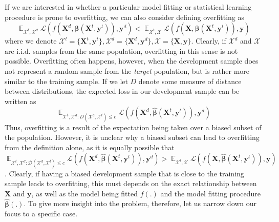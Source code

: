 \documentclass[12pt]{article}
\DeclareMathOperator{\E}{\mathbb{E}}
\begin{document}
	If we are interested in whether a particular model fitting or statistical learning procedure is prone to overfitting, we can also consider defining overfitting as 
	\begin{equation}
	\E_{\mathcal{X}^t, \mathcal{X}^d} \mathcal{L}(f(\boldsymbol{X}^d, \hat{\boldsymbol{\beta}}(\boldsymbol{X}^t, \boldsymbol{y}^t)), \boldsymbol{y}^d) < \E_{\mathcal{X}^t, \mathcal{X}} \mathcal{L} (f(\boldsymbol{X}, \hat{\boldsymbol{\beta}}(\boldsymbol{X}^t, \boldsymbol{y}^t)), \boldsymbol{y}) 
	\end{equation}
	where we denote $\mathcal{X}^t = \{ \boldsymbol{X}^t, \boldsymbol{y}^t \}, \mathcal{X}^d = \{ \boldsymbol{X}^d, \boldsymbol{y}^d \}, \mathcal{X} = \{ \boldsymbol{X}, \boldsymbol{y} \}$. Clearly, if $\mathcal{X}^d$ and $\mathcal{X}$  are i.i.d. samples from the same population, overfitting in this sense is not possible. Overfitting often happens, however, when the development sample does not represent a random sample from the \emph{target} population, but is rather more similar to the training sample. If we let $D$ denote some measure of distance between distributions, the expected loss in our development sample can be written as
	\begin{equation}
		\E_{\mathcal{X}^t, \mathcal{X}^d: D(\mathcal{X}^d, \mathcal{X}^t) \leq c} \mathcal{L}(f(\boldsymbol{X}^d, \hat{\boldsymbol{\beta}}(\boldsymbol{X}^t, \boldsymbol{y}^t)), \boldsymbol{y}^d)
	\end{equation}
	Thus, overfitting is a result of the expectation being taken over a biased subset of the population. However, it is unclear why a biased subset can lead to overfitting from the definition alone, as it is equally possible that $\E_{\mathcal{X}^t, \mathcal{X}^d: \mathcal{D}(\mathcal{X}^d, \mathcal{X}^t) \leq c} \mathcal{L}(f(\boldsymbol{X}^d, \hat{\boldsymbol{\beta}}(\boldsymbol{X}^t, \boldsymbol{y}^t)), \boldsymbol{y}^d) > \E_{\mathcal{X}^t, \mathcal{X}} \mathcal{L} (f(\boldsymbol{X}, \hat{\boldsymbol{\beta}}(\boldsymbol{X}^t, \boldsymbol{y}^t)), \boldsymbol{y})$. Clearly, if having a biased development sample that is close to the training sample leads to overfitting, this must depends on the exact relationship between $\boldsymbol{X}$ and $\boldsymbol{y}$, as well as the model being fitted $f(.)$ and the model fitting procedure $\hat{\boldsymbol{\beta}}(.)$. To give more insight into the problem, therefore, let us narrow down our focus to a specific case. 
	
\end{document}
